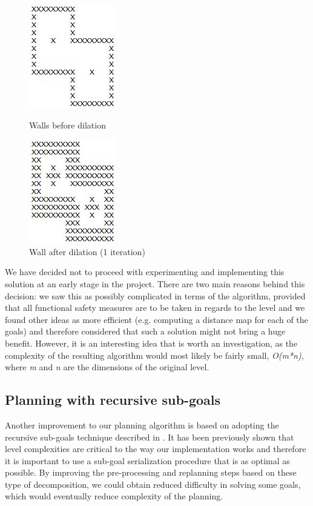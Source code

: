 \documentclass[letterpaper]{article}
\begin{document}
\begin{figure}[!htb]
\centering
\begin{minipage}[b]{0.45\linewidth}
	\centering
	\includegraphics[scale=0.4]{level_before_dilation.JPG}
	\caption{Walls before dilation}
	\label{fig:level_before_dilation}
\end{minipage}
\quad
\begin{minipage}[b]{0.45\linewidth}
	\centering
	\includegraphics[scale=0.5]{level_after_dilation.JPG}
	\caption{Wall after dilation (1 iteration)}
	\label{fig:level_after_dilation}
\end{minipage}
\end{figure}

We have decided not to proceed with experimenting and implementing this solution at an early stage in the project. There are two main reasons behind this decision: we saw this as possibly complicated in terms of the algorithm, provided that all functional safety measures are to be taken in regards to the level and we found other ideas as more efficient (e.g. computing a distance map for each of the goals) and therefore considered that such a solution might not bring a huge benefit. However, it is an interesting idea that is worth an investigation, as the complexity of the resulting algorithm would most likely be fairly small, \textit{O(m*n)}, where \textit{m} and \textit{n} are the dimensions of the original level.

\subsection{Planning with recursive sub-goals}
Another improvement to our planning algorithm is based on adopting the recursive sub-goals technique described in \cite{recursiveSubgoals}. It has been previously shown that level complexities are critical to the way our implementation works and therefore it is important to use a sub-goal serialization procedure that is as optimal as possible. By improving the pre-processing and replanning steps based on these type of decomposition, we could obtain reduced difficulty in solving some goals, which would eventually reduce complexity of the planning.
\end{document}
